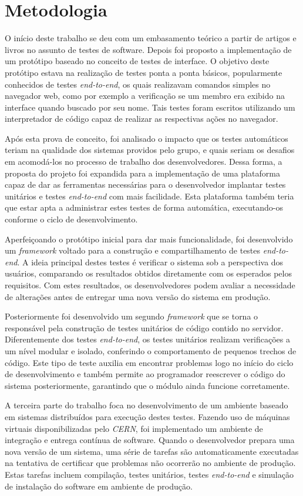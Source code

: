 \section{Metodologia}
 O início deste trabalho se deu com um embasamento teórico a partir de artigos e livros no assunto de testes de software. Depois foi proposto a implementação de um protótipo baseado no conceito de testes de interface. O objetivo deste protótipo estava na realização de testes ponta a ponta básicos, popularmente conhecidos de testes \emph{end-to-end}, os quais realizavam comandos simples no navegador web, como por exemplo a verificação se um membro era exibido na interface quando buscado por seu nome. Tais testes foram escritos utilizando um interpretador de código capaz de realizar as respectivas ações no navegador.

 Após esta prova de conceito, foi analisado o impacto que os testes automáticos teriam na qualidade dos sistemas providos pelo grupo, e quais seriam os desafios em acomodá-los no processo de trabalho dos desenvolvedores. Dessa forma, a proposta do projeto foi expandida para a implementação de uma plataforma capaz de dar as ferramentas necessárias para o desenvolvedor implantar testes unitários e testes \emph{end-to-end} com mais facilidade. Esta plataforma também teria que estar apta a administrar estes testes de forma automática, executando-os conforme o ciclo de desenvolvimento.

Aperfeiçoando o protótipo inicial para dar mais funcionalidade, foi desenvolvido um \emph{framework} voltado para a construção e compartilhamento de testes \emph{end-to-end}. A ideia principal destes testes é verificar o sistema sob a perspectiva dos usuários, comparando os resultados obtidos diretamente com os esperados pelos requisitos. Com estes resultados, os desenvolvedores podem avaliar a necessidade de alterações antes de entregar uma nova versão do sistema em produção.

Posteriormente foi desenvolvido um segundo \emph{framework} que se torna o responsável pela construção de testes unitários de código contido no servidor. Diferentemente dos testes \emph{end-to-end}, os testes unitários realizam verificações a um nível modular e isolado, conferindo o comportamento de pequenos trechos de código. Este tipo de teste auxilia em encontrar problemas logo no início do ciclo de desenvolvimento e também permite ao programador reescrever o código do sistema posteriormente, garantindo que o módulo ainda funcione corretamente.

A terceira parte do trabalho foca no desenvolvimento de um ambiente baseado em sistemas distribuídos para execução destes testes. Fazendo uso de máquinas virtuais disponibilizadas pelo \emph{CERN}, foi implementado um ambiente de integração e entrega contínua de software. Quando o desenvolvedor prepara uma nova versão de um sistema, uma série de tarefas são automaticamente executadas na tentativa de certificar que problemas não ocorrerão no ambiente de produção. Estas tarefas incluem compilação, testes unitários, testes \emph{end-to-end} e simulação de instalação do software em ambiente de produção.

